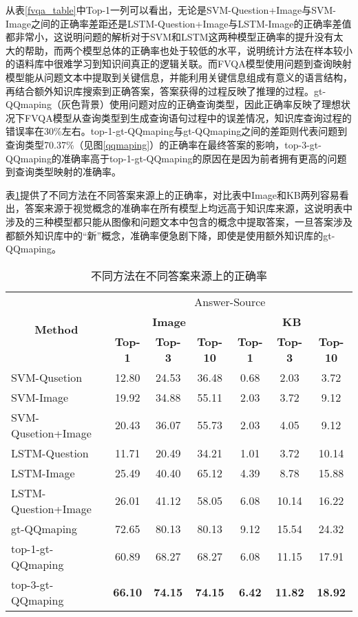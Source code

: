 从表\ref{fvqa_table}中Top-1一列可以看出，无论是SVM-Question+Image与SVM-Image之间的正确率差距还是LSTM-Question+Image与LSTM-Image的正确率差值都非常小，这说明问题的解析对于SVM和LSTM这两种模型正确率的提升没有太大的帮助，而两个模型总体的正确率也处于较低的水平，说明统计方法在样本较小的语料库中很难学习到知识间真正的逻辑关联。而FVQA模型使用问题到查询映射模型能从问题文本中提取到关键信息，并能利用关键信息组成有意义的语言结构，再结合额外知识库搜索到正确答案，答案获得的过程反映了推理的过程。gt-QQmaping（灰色背景）使用问题对应的正确查询类型，因此正确率反映了理想状况下FVQA模型从查询类型到生成查询语句过程中的误差情况，知识库查询过程的错误率在30\%左右。top-1-gt-QQmaping与gt-QQmaping之间的差距则代表问题到查询类型70.37\%（见图\ref{qqmaping}）的正确率在最终答案的影响，top-3-gt-QQmaping的准确率高于top-1-gt-QQmaping的原因在是因为前者拥有更高的问题到查询类型映射的准确率。

表\ref{fvqa_answerSource}提供了不同方法在不同答案来源上的正确率，对比表中Image和KB两列容易看出，答案来源于视觉概念的准确率在所有模型上均远高于知识库来源，这说明表中涉及的三种模型都只能从图像和问题文本中包含的概念中提取答案，一旦答案涉及都额外知识库中的“新”概念，准确率便急剧下降，即使是使用额外知识库的gt-QQmaping。
\begin{table}[H]
\centering
\caption{不同方法在不同答案来源上的正确率}
\begin{tabular}{lcccccc}
\toprule
\multicolumn{1}{c}{\multirow{3}{*}{\textbf{Method}}} & \multicolumn{6}{c}{Answer-Source}\\
\cmidrule(r){2-7}
 & \multicolumn{3}{c}{\textbf{Image}} & \multicolumn{3}{c}{\textbf{KB}}\\
\cmidrule(r){2-4}
\cmidrule(r){5-7}
 & \textbf{Top-1} & \textbf{Top-3} & \textbf{Top-10} & \textbf{Top-1} & \textbf{Top-3} & \textbf{Top-10} \\
 \midrule
SVM-Qusetion        & 12.80 & 24.53 & 36.48 & 0.68 & 2.03 & 3.72 \\
SVM-Image           & 19.92 & 34.88 & 55.11 & 2.03 & 3.72 & 9.12 \\
SVM-Qusetion+Image  & 20.43 & 36.07 & 55.73 & 2.03 & 4.05 & 9.12 \\
LSTM-Question       & 11.71 & 20.49 & 34.21 & 1.01 & 3.72 & 10.14 \\
LSTM-Image          & 25.49 & 40.40 & 65.12 & 4.39 & 8.78 & 15.88 \\
LSTM-Question+Image & 26.01 & 41.12 & 58.05 & 6.08 & 10.14 & 16.22 \\
\midrule
\cellcolor[HTML]{C0C0C0}gt-QQmaping & \cellcolor[HTML]{C0C0C0}72.65 & \cellcolor[HTML]{C0C0C0}80.13 & \cellcolor[HTML]{C0C0C0}80.13  & \cellcolor[HTML]{C0C0C0}9.12 & \cellcolor[HTML]{C0C0C0}15.54 & \cellcolor[HTML]{C0C0C0}24.32 \\
top-1-gt-QQmaping & 60.89 & 68.27 & 68.27 & 6.08 & 11.15 & 17.91 \\ 
top-3-gt-QQmaping & \textbf{66.10} & \textbf{74.15} & \textbf{74.15} & \textbf{6.42} & \textbf{11.82} & \textbf{18.92} \\
\bottomrule
\end{tabular}
\label{fvqa_answerSource}
\end{table}

